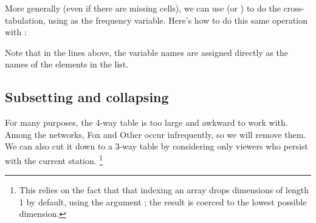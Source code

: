 \documentclass[11pt]{book}
\renewenvironment{knitrout}{\small\renewcommand{\baselinestretch}{.85}}{} %
\begin{document}
More generally (even if there are missing cells), we can 
use  (or )
to do the cross-tabulation, using  as the
frequency variable.  Here's how to do this same operation with :
\begin{knitrout}
\color{fgcolor}\begin{kframe}
\begin{alltt}
 \hlkwb{<-}  \hlopt{~}  
 \hlkwb{<-} \hlstd{(}\hlstd{=}\hlstd{(}\hlstd{,}\hlstd{,}\hlstd{,}\hlstd{,}\hlstd{),}
                \hlstd{=}\hlstd{(}\hlstd{,}\hlstd{,}\hlstd{,}\hlstd{,}\hlstd{,}\hlstd{,}\hlstd{,}
                       \hlstd{,}\hlstd{,}\hlstd{,}\hlstd{),}
                \hlstd{=}\hlstd{(}\hlstd{,}\hlstd{,}\hlstd{,}\hlstd{,}\hlstd{),}
                \hlstd{=}\hlstd{(}\hlstd{,}\hlstd{,}\hlstd{))}
\end{alltt}
\end{kframe}
\end{knitrout}
\noindent Note that in the lines above, the variable names are assigned directly
as the names of the elements in the  list.

\subsection{Subsetting and collapsing}
For many purposes, 
the 4-way table 
is too large and awkward to work with. Among the networks,
Fox and Other occur infrequently, so we will remove them.
We can also cut it down to a 3-way table by considering only viewers who persist
with the current station.%
\footnote{This relies on the fact that that indexing
an array drops dimensions of length 1 by default,
using the argument ;
the result is coerced to the lowest possible dimension.
}
\end{document}
